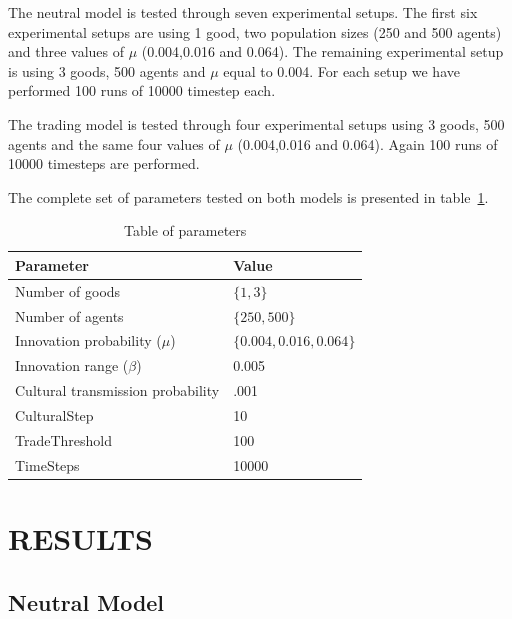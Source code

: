 \documentclass{wscpaperproc}
\begin{document}
The neutral model is tested through seven experimental setups. The first six experimental setups are using 1 good, two population sizes (250 and 500 agents) and three values of $\mu$ (0.004,0.016 and 0.064). The remaining experimental setup is using 3 goods, 500 agents and $\mu$ equal to 0.004. For each setup we have performed 100 runs of 10000 timestep each. 

The trading model is tested through four experimental setups using 3 goods, 500 agents and the same four values of $\mu$ (0.004,0.016 and 0.064). Again 100 runs of 10000 timesteps are performed.

The complete set of parameters tested on both models is presented in table~\ref{tab:parameters}. 


\begin{table}
\begin{center}
\begin{tabular}{@{}ll@{}}
\toprule
Parameter & Value \\
\midrule
Number of goods & $\{1,3\}$ \\
Number of agents & $\{250,500\}$ \\
Innovation probability ($\mu$) & $\{0.004,0.016,0.064\}$ \\
Innovation range ($\beta$) & 0.005\\
Cultural transmission probability & .001\\
CulturalStep &  10 \\
TradeThreshold & 100  \\
TimeSteps & 10000 \\
\bottomrule
\end{tabular}
\caption{Table of parameters}\label{tab:parameters}
\end{center}
\end{table}






\section{RESULTS}
\subsection{Neutral Model}
\end{document}
